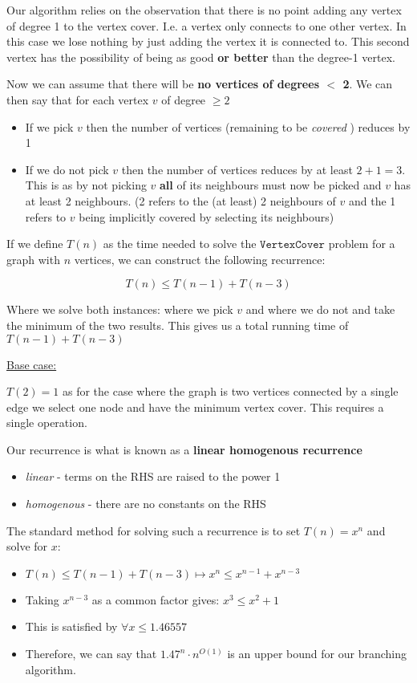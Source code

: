 \documentclass{article}
\begin{document}
Our algorithm relies on the observation that there is no point adding any vertex of degree 1 to the vertex cover. I.e. a vertex only connects to one other vertex. In this case we lose nothing by just adding the vertex it is connected to. This second vertex has the possibility of being as good \textbf{or better} than the degree-1 vertex.

Now we can assume that there will be \textbf{no vertices of degrees $<$ 2}. We can then say that for each vertex $v$ of degree $\geq 2$

\begin{itemize}
  \item If we pick $v$ then the number of vertices (remaining to be \textit{covered} ) reduces by 1
  \item If we do not pick $v$  then the number of vertices reduces by at least $2+1=3$. This is as by not picking $v$ \textbf{all} of its neighbours must now be picked and $v$ has at least 2 neighbours. (2 refers to the (at least) 2 neighbours of $v$ and the 1 refers to $v$ being implicitly covered by selecting its neighbours)
\end{itemize}

If we define $T(n)$ as the time needed to solve the $\texttt{VertexCover} $ problem for a graph with $n$ vertices, we can construct the following recurrence:

\[
  T(n) \leq T(n-1) + T(n-3)
\]

Where we solve both instances: where we pick $v$ and where we do not and take the minimum of the two results. This gives us a total running time of $T(n-1) + T(n-3)$

\underline{Base case:}

$T(2) = 1$ as for the case where the graph is two vertices connected by a single edge we select one node and have the minimum vertex cover. This requires a single operation.

Our recurrence is what is known as a \textbf{linear homogenous recurrence}
\begin{itemize}
  \item \textit{linear} - terms on the RHS are raised to the power 1
  \item \textit{homogenous} - there are no constants on the RHS
\end{itemize}

The standard method for solving such a recurrence is to set $T(n) = x^{n}$ and solve for $x$:

\begin{itemize}
  \item $T(n) \leq T(n-1) + T(n-3) \mapsto x^{n}\leq x^{n-1}+x^{n-3}$
  \item Taking $x^{n-3}$ as a common factor gives: $x^{3} \leq x^{2}+1$

  \item This is satisfied by $\forall x \leq 1.46557$
  \item Therefore, we can say that $1.47^{n} \cdot n^{O(1)}$ is an upper bound for our branching algorithm.
\end{itemize}
\end{document}
